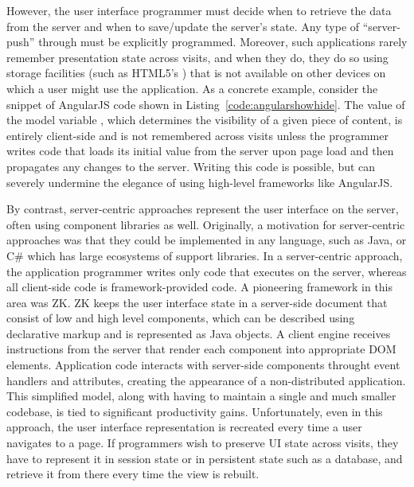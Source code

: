 
However, the user interface programmer must decide when to retrieve the data
from the server and when to save/update the server's state.  Any type of ``server-push''
through must be explicitly programmed.  Moreover, such applications
rarely remember presentation state across visits, and when they do, they do so 
using storage facilities (such as HTML5's ) that is not 
available on other devices on which a user might use the application.
As a concrete example, consider the snippet of AngularJS code shown in
Listing~\ref{code:angularshowhide}. The value of the model variable ,
which determines the visibility of a given piece of content, is entirely
client-side and is not remembered across visits unless the programmer writes
code that loads its initial value from the server upon page load and then 
propagates any changes to the server.  Writing this code is possible, but can 
severely undermine the elegance of using high-level frameworks like AngularJS.

By contrast, server-centric approaches represent the user interface on
the server, often using component libraries as well.  Originally, a motivation
for server-centric approaches was that they could be implemented in any language,
such as Java, or C\# which has large ecosystems of support libraries.
In a server-centric approach, the application programmer writes only code
that executes on the server, whereas all client-side code is framework-provided
code.  A pioneering framework in this area was ZK\cite{chen2007zk}.
ZK keeps the user interface state in a server-side document that consist
of low and high level components, which can be described using declarative
markup and is represented as Java objects.
A client engine receives instructions from the server that render each 
component into appropriate DOM elements.  Application code interacts
with server-side components throught event handlers and attributes, 
creating the appearance of a non-distributed application.  This simplified
model, along with having to maintain a single and much smaller codebase,
is tied to significant productivity gains.
Unfortunately, even in this approach, the user interface representation 
is recreated every time a user navigates to a page.  If programmers wish to
preserve UI state across visits, they have to represent it in session state
or in persistent state such as a database, and retrieve it from there every 
time the view is rebuilt.

